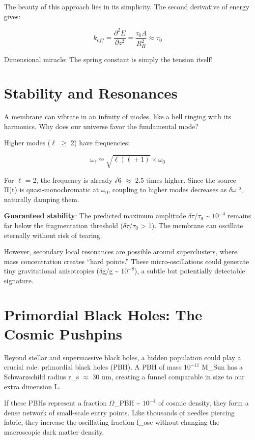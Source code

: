 \documentclass[
  11pt,
]{report}
\begin{document}
The beauty of this approach lies in its simplicity. The second
derivative of energy gives:

\[k_{eff} = \frac{\partial ^2E}{\partial z^2} = \frac{\tau_0 A}{R_H^2} \approx \tau_0\]

Dimensional miracle: The spring constant is simply the tension itself!

\section{Stability and Resonances}\label{stability-and-resonances}

A membrane can vibrate in an infinity of modes, like a bell ringing with
its harmonics. Why does our universe favor the fundamental mode?

Higher modes (\(\ell\) \(\geq\) 2) have frequencies:

\[\omega_\ell \simeq \sqrt{\ell(\ell+1)} × \omega_0\]

For \(\ell\) = 2, the frequency is already √6 \(\approx\) 2.5 times
higher. Since the source Π(t) is quasi-monochromatic at \(\omega_0\),
coupling to higher modes decreases as \(\delta\omega\)⁻², naturally
damping them.

\textbf{Guaranteed stability}: The predicted maximum amplitude
\(\delta\tau\)/\(\tau_0\) \textasciitilde{} \(10^{-4}\) remains far
below the fragmentation threshold (\(\delta\tau\)/\(\tau_0\)
\textgreater{} 1). The membrane can oscillate eternally without risk of
tearing.

However, secondary local resonances are possible around superclusters,
where mass concentration creates ``hard points.'' These
micro-oscillations could generate tiny gravitational anisotropies
(\(\delta\)g/g \textasciitilde{} \(10^{-8}\)), a subtle but potentially
detectable signature.

\section{Primordial Black Holes: The Cosmic
Pushpins}\label{primordial-black-holes-the-cosmic-pushpins-1}

Beyond stellar and supermassive black holes, a hidden population could
play a crucial role: primordial black holes (PBH). A PBH of mass
\(10^{-11}\) M\_Sun has a Schwarzschild radius r\_s \(\approx\) 30 nm,
creating a funnel comparable in size to our extra dimension L.

If these PBHs represent a fraction \(\Omega\)\_PBH \textasciitilde{}
\(10^{-4}\) of cosmic density, they form a dense network of small-scale
entry points. Like thousands of needles piercing fabric, they increase
the oscillating fraction f\_osc without changing the macroscopic dark
matter density.
\end{document}
